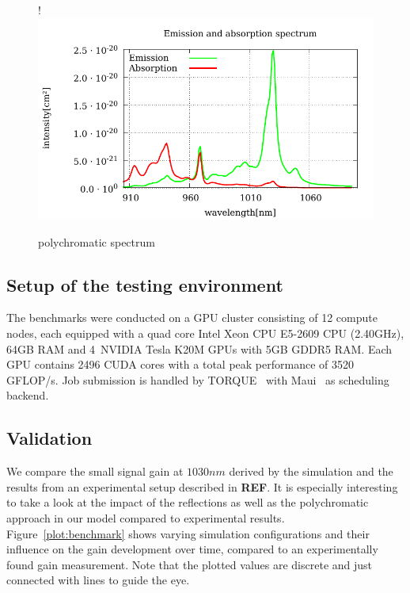 \begin{figure}[H]
  \centerline{
     {!} {\includegraphics{plot/sigma.pdf}}
  }
  \caption{polychromatic spectrum}
\label{plot:polychromatic_spectrum}
\end{figure}

\subsection{Setup of the testing environment}
\label{subsec:testingEnvironment}
The benchmarks were conducted on a GPU cluster consisting of 12 compute nodes,
each equipped with a quad core Intel Xeon CPU E5-2609 CPU (2.40GHz), 64GB RAM
and 4~NVIDIA Tesla K20M GPUs with 5GB GDDR5 RAM\@. Each GPU contains 2496 CUDA cores with a total
peak performance of 3520 GFLOP/s. Job submission is handled by TORQUE~\cite{torque} 
with Maui~\cite{maui} as scheduling backend. 


\subsection{Validation}
\label{subsec:validation}
We compare the small signal gain at $1030 nm$
derived by the simulation and the results from an experimental setup described
in \textbf{REF}. 
It is especially interesting to take a look at the impact of the reflections as well as the polychromatic
approach in our model compared to experimental results. Figure~\ref{plot:benchmark} shows
varying simulation configurations and their influence on the
gain development over time, compared to an experimentally found gain measurement.
Note that the plotted values are discrete and just connected with lines to guide the eye.

